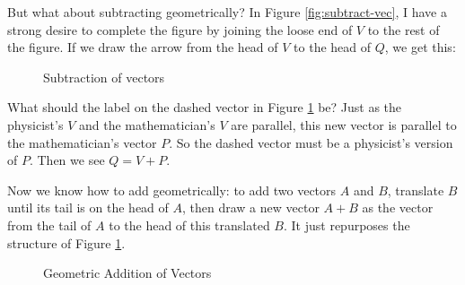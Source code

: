\documentclass[00-livre-main.tex]{subfiles}
\begin{document}
But what about subtracting geometrically? In Figure \ref{fig:subtract-vec}, I have a strong desire to complete the figure by joining the loose end of $V$ to the rest of the figure. If we draw the arrow from the head of $V$ to the head of $Q$, we get this:
\begin{figure}[h!]
\centering
{}
\caption{Subtraction of vectors}
\label{fig:add-vec}
\end{figure}

What should the label on the dashed vector in Figure \ref{fig:add-vec} be? Just as the physicist's $V$ and the 
mathematician's $V$ are parallel, this new vector is parallel to the mathematician's vector $P$. 
So the dashed vector must be a physicist's version of $P$. Then we see $Q= V+P$.

Now we know how to add geometrically: to add two vectors $A$ and $B$, translate $B$ until its tail is on the head of $A$, then draw a new vector $A+B$ as the vector from the tail of $A$ to the head of this translated $B$. It just repurposes the structure of Figure \ref{fig:add-vec}.

\begin{figure}[h!]
\centering
{}
\caption{Geometric Addition of Vectors}
\label{fig:geom-add-vec}
\end{figure}
\end{document}
